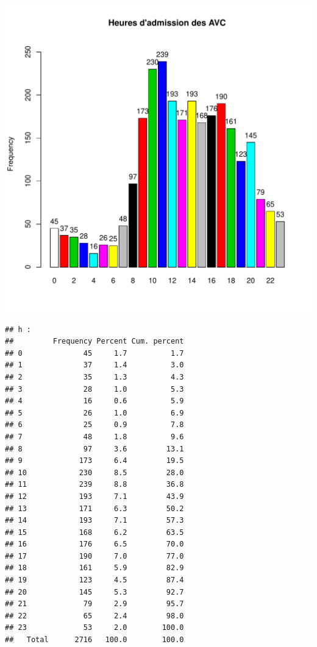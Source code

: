 \documentclass[12pt,english,french,twoside]{report}\usepackage[]{graphicx}\usepackage[]{color}
\makeatletter
\def\maxwidth{ %
  \ifdim\Gin@nat@width>\linewidth
    \linewidth
  \else
    \Gin@nat@width
  \fi
}
\newenvironment{kframe}{%
 \def\at@end@of@kframe{}%
 \ifinner\ifhmode%
  \def\at@end@of@kframe{\end{minipage}}%
  \begin{minipage}{\columnwidth}%
 \fi\fi%
 \def\FrameCommand##1{\hskip\@totalleftmargin \hskip-\fboxsep
 \colorbox{shadecolor}{##1}\hskip-\fboxsep
     \hskip-\linewidth \hskip-\@totalleftmargin \hskip\columnwidth}%
 \MakeFramed {\advance\hsize-\width
   \@totalleftmargin\z@ \linewidth\hsize
   \@setminipage}}%
 {\par\unskip\endMakeFramed%
 \at@end@of@kframe}
\newenvironment{knitrout}{}{} %
\makeatother
\begin{document}
\begin{knitrout}
\includegraphics[width=\maxwidth]{figure/heure_avc2} 
\begin{kframe}\begin{verbatim}
## h :  
##         Frequency Percent Cum. percent
## 0              45     1.7          1.7
## 1              37     1.4          3.0
## 2              35     1.3          4.3
## 3              28     1.0          5.3
## 4              16     0.6          5.9
## 5              26     1.0          6.9
## 6              25     0.9          7.8
## 7              48     1.8          9.6
## 8              97     3.6         13.1
## 9             173     6.4         19.5
## 10            230     8.5         28.0
## 11            239     8.8         36.8
## 12            193     7.1         43.9
## 13            171     6.3         50.2
## 14            193     7.1         57.3
## 15            168     6.2         63.5
## 16            176     6.5         70.0
## 17            190     7.0         77.0
## 18            161     5.9         82.9
## 19            123     4.5         87.4
## 20            145     5.3         92.7
## 21             79     2.9         95.7
## 22             65     2.4         98.0
## 23             53     2.0        100.0
##   Total      2716   100.0        100.0
\end{verbatim}
\end{kframe}
\end{knitrout}
\end{document}
